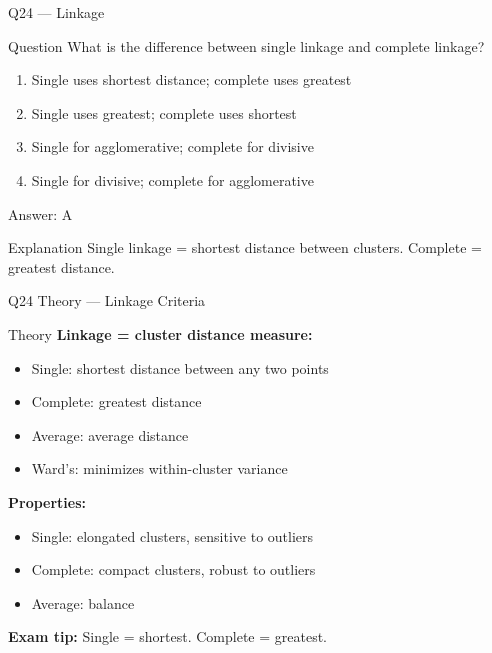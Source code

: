 \documentclass[aspectratio=169,8pt]{beamer}
\begin{document}
	\begin{frame}{Q24 --- Linkage}
		\begin{block}{Question}
			What is the difference between single linkage and complete linkage?
		\end{block}
		\begin{enumerate}[label=\Alph*.]
			\item Single uses shortest distance; complete uses greatest
			\item Single uses greatest; complete uses shortest
			\item Single for agglomerative; complete for divisive
			\item Single for divisive; complete for agglomerative
		\end{enumerate}
		\begin{exampleblock}{Answer: A}
		\end{exampleblock}
		\begin{block}{Explanation}
			Single linkage = shortest distance between clusters. Complete = greatest distance.
		\end{block}
	\end{frame}
	
	\begin{frame}{Q24 Theory --- Linkage Criteria}
		\begin{block}{Theory}
			\textbf{Linkage = cluster distance measure:}
			\begin{itemize}
				\item Single: shortest distance between any two points
				\item Complete: greatest distance
				\item Average: average distance
				\item Ward's: minimizes within-cluster variance
			\end{itemize}
			\textbf{Properties:}
			\begin{itemize}
				\item Single: elongated clusters, sensitive to outliers
				\item Complete: compact clusters, robust to outliers
				\item Average: balance
			\end{itemize}
			\textbf{Exam tip:} Single = shortest. Complete = greatest.
		\end{block}
	\end{frame}
	
\end{document}
